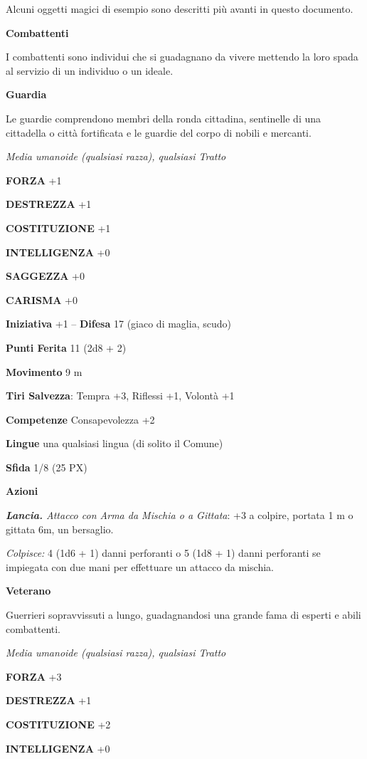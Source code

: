\begin{multicols}{2}
Alcuni oggetti magici di esempio sono descritti più avanti in questo documento.

\textbf{Combattenti}

I combattenti sono individui che si guadagnano da vivere mettendo la loro spada al servizio di un individuo o un ideale.

\medskip\textbf{Guardia}

Le guardie comprendono membri della ronda cittadina, sentinelle di una cittadella o città fortificata e le guardie del corpo di nobili e mercanti.

\textit{Media umanoide (qualsiasi razza), qualsiasi Tratto}

\textbf{FORZA} +1

\textbf{DESTREZZA} +1

\textbf{COSTITUZIONE} +1

\textbf{INTELLIGENZA} +0

\textbf{SAGGEZZA} +0

\textbf{CARISMA} +0

\textbf{Iniziativa} +1 -- \textbf{Difesa} 17 (giaco di maglia, scudo)

\textbf{Punti Ferita} 11 (2d8 + 2)

\textbf{Movimento} 9 m

\textbf{Tiri Salvezza}: Tempra +3, Riflessi +1, Volontà +1

\textbf{Competenze} Consapevolezza +2

\textbf{Lingue} una qualsiasi lingua (di solito il Comune)

\textbf{Sfida} 1/8 (25 PX)

\textbf{Azioni}

\textit{\textbf{Lancia.} Attacco con Arma da Mischia o a Gittata}: +3 a colpire, portata 1 m o gittata 6m, un bersaglio.

\textit{Colpisce:} 4 (1d6 + 1) danni perforanti o 5 (1d8 + 1) danni perforanti se impiegata con due mani per effettuare un attacco da mischia.

\medskip\textbf{Veterano}

Guerrieri sopravvissuti a lungo, guadagnandosi una grande fama di esperti e abili combattenti.

\textit{Media umanoide (qualsiasi razza), qualsiasi Tratto}

\textbf{FORZA} +3

\textbf{DESTREZZA} +1

\textbf{COSTITUZIONE} +2

\textbf{INTELLIGENZA} +0


\end{multicols}
